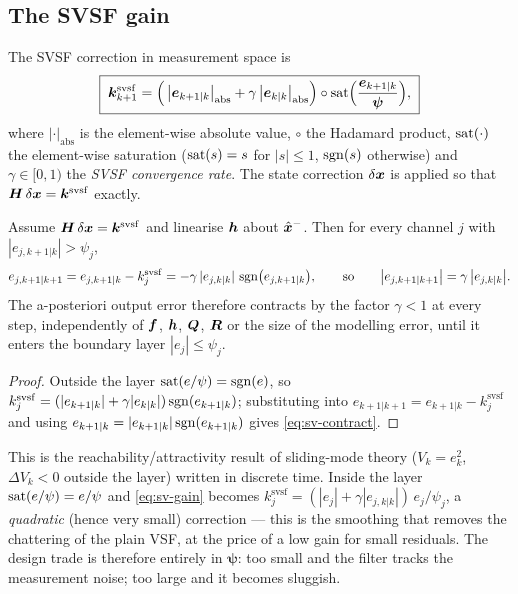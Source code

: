 \subsection{The SVSF gain}
The SVSF correction in measurement space is \cite[Eq.~(29)]{habibi2007svsf}
\begin{equation}
\boxed{\;
\bm{k}^{\mathrm{svsf}}_{k+1}
 = \Big(\,\big|\bm{e}_{k+1|k}\big|_{\mathrm{abs}}
        + \gamma\,\big|\bm{e}_{k|k}\big|_{\mathrm{abs}}\Big)
   \circ \operatorname{sat}\!\Big(\frac{\bm{e}_{k+1|k}}{\bm\psi}\Big),\;}
\label{eq:sv-gain}
\end{equation}
where $|\cdot|_{\mathrm{abs}}$ is the element-wise absolute value, $\circ$ the Hadamard product,
$\operatorname{sat}(\cdot)$ the element-wise saturation
($\operatorname{sat}(s)=s$ for $|s|\le1$, $\operatorname{sgn}(s)$ otherwise) and $\gamma\in[0,1)$ the \emph{SVSF convergence
rate}.  The state correction $\delta\bm{x}$ is applied so that
$\bm{H}\,\delta\bm{x}=\bm{k}^{\mathrm{svsf}}$ exactly.

\begin{theorem}\label{thm:sv-conv}
Assume $\bm{H}\,\delta\bm{x}=\bm{k}^{\mathrm{svsf}}$ and linearise $\bm{h}$ about $\hat{\bm{x}}^{-}$.  Then for
every channel $j$ with $|e_{j,k+1|k}|>\psi_j$,
\begin{equation}
e_{j,k+1|k+1}=e_{j,k+1|k}-k^{\mathrm{svsf}}_{j}
 = -\gamma\,|e_{j,k|k}|\,\operatorname{sgn}\!\big(e_{j,k+1|k}\big),
\qquad\text{so}\qquad
\big|e_{j,k+1|k+1}\big| = \gamma\,\big|e_{j,k|k}\big| .
\label{eq:sv-contract}
\end{equation}
The a-posteriori output error therefore contracts by the factor $\gamma<1$ at every step,
independently of $\bm{f}$, $\bm{h}$, $\bm{Q}$, $\bm{R}$ or the size of the modelling error, until it enters
the boundary layer $|e_j|\le\psi_j$.
\end{theorem}
\begin{proof}
Outside the layer $\operatorname{sat}(e/\psi)=\operatorname{sgn}(e)$, so
$k^{\mathrm{svsf}}_j=(|e_{k+1|k}|+\gamma|e_{k|k}|)\operatorname{sgn}(e_{k+1|k})$; substituting into
$e_{k+1|k+1}=e_{k+1|k}-k^{\mathrm{svsf}}_j$ and using
$e_{k+1|k}=|e_{k+1|k}|\operatorname{sgn}(e_{k+1|k})$ gives \eqref{eq:sv-contract}.
\end{proof}

This is the reachability/attractivity result of sliding-mode theory
($V_k=e_k^2$, $\Delta V_k<0$ outside the layer) written in discrete time.  Inside the layer
$\operatorname{sat}(e/\psi)=e/\psi$ and \eqref{eq:sv-gain} becomes
$k^{\mathrm{svsf}}_j=(|e_j|+\gamma|e_{j,k|k}|)\,e_j/\psi_j$, a \emph{quadratic} (hence very small)
correction --- this is the smoothing that removes the chattering of the plain VSF, at the price of
a low gain for small residuals.  The design trade is therefore entirely in $\bm\psi$: too small and
the filter tracks the measurement noise; too large and it becomes sluggish.

